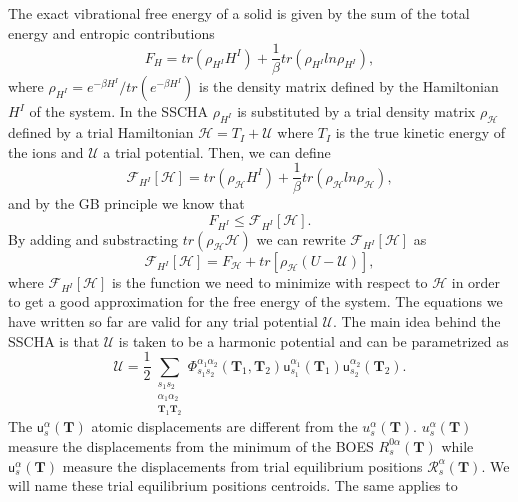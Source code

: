 The exact vibrational free energy of a solid is given by the sum of the total energy and entropic contributions
\begin{equation}
 F_{H}=tr(\rho_{H^{I}}H^{I})+\frac{1}{\beta}tr(\rho_{H^{I}}ln\rho_{H^{I}}),
\end{equation}
where $\rho_{H^{I}}=e^{-\beta H^{I}}/tr(e^{-\beta H^{I}})$ is the density matrix defined by the Hamiltonian $H^{I}$ of the system. In the SSCHA $\rho_{H^{I}}$ is substituted by a trial density matrix $\rho_{\mathcal{H}}$ defined 
by a trial Hamiltonian $\mathcal{H}=T_{I}+\mathcal{U}$ where $T_{I}$ is the true kinetic energy of the ions and $\mathcal{U}$ a trial potential. Then, we can define
\begin{equation}
 \mathcal{F}_{H^{I}}[\mathcal{H}]=tr(\rho_{\mathcal{H}}H^{I})+\frac{1}{\beta}tr(\rho_{\mathcal{H}}ln\rho_{\mathcal{H}}),
\end{equation}
and by the GB principle we know that
\begin{equation}
 F_{H^{I}}\le\mathcal{F}_{H^{I}}[\mathcal{H}].
\end{equation} 
By adding and substracting $tr(\rho_{\mathcal{H}}\mathcal{H})$ we can rewrite $\mathcal{F}_{H^{I}}[\mathcal{H}]$ as
\begin{equation}
 \label{scha-equation}
 \mathcal{F}_{H^{I}}[\mathcal{H}]=F_{\mathcal{H}}+tr[\rho_{\mathcal{H}}(U-\mathcal{U})],
\end{equation}
where $\mathcal{F}_{H^{I}}[\mathcal{H}]$ is the function we need to minimize with respect to $\mathcal{H}$ in order to get a good approximation for the free energy of the system. The equations we have written so far are valid 
for any trial potential $\mathcal{U}$. The main idea behind the SSCHA is that $\mathcal{U}$ is taken to be a harmonic potential and can be parametrized as
\begin{equation}
 \mathcal{U}=\frac{1}{2}\sum\limits_{\substack{s_{1}s_{2} \\ \alpha_{1}\alpha_{2} \\ \mathbf{T}_{1}\mathbf{T}_{2}}}\Phi_{s_{1}s_{2}}^{\alpha_{1}\alpha_{2}}(\mathbf{T}_{1},\mathbf{T}_{2})\mathsf{u}_{s_{1}}^{
 \alpha_{1}}(\mathbf{T}_{1})\mathsf{u}_{s_{2}}^{\alpha_{2}}(\mathbf{T}_{2}).
\end{equation}
The $\mathsf{u}_{s}^{\alpha}(\mathbf{T})$ atomic displacements are different from the $u_{s}^{\alpha}(\mathbf{T})$. $u_{s}^{\alpha}(\mathbf{T})$ measure the displacements from the minimum of the BOES $R_{s}^{0\alpha}(\mathbf{T})$
while $\mathsf{u}_{s}^{\alpha}(\mathbf{T})$ measure the displacements from trial equilibrium positions $\mathcal{R}_{s}^{\alpha}(\mathbf{T})$. We will name these trial equilibrium positions centroids. The same applies to 
